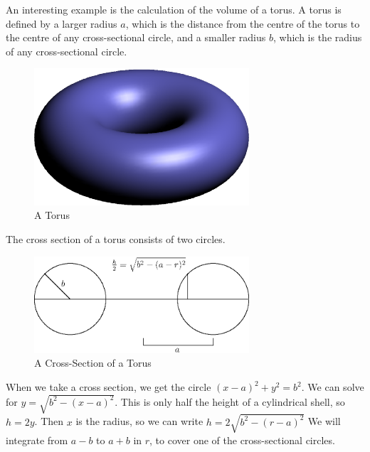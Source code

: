 \documentclass[fleqn]{report}
\begin{document}
\begin{example}
An interesting example is the calculation of the volume of a
torus. A torus is defined by a larger radius $a$, which is
the distance from the centre of the torus to the centre of any
cross-sectional circle, and a smaller radius $b$, which is the
radius of any cross-sectional circle.

\begin{figure}[ht]
\centering
\includegraphics[width=8cm]{figure23.eps}
\caption{A Torus}
\label{figure-torus}
\end{figure}

The cross section of a torus consists of two circles.

\begin{figure}[ht]
\centering
\includegraphics[width=8cm]{figure24.eps}
\caption{A Cross-Section of a Torus}
\label{figure-cross-section-torus}
\end{figure}

When we take a cross section, we get the circle $(x-a)^2 + y^2
= b^2$. We can solve for $y = \sqrt{b^2 - (x-a)^2}$. This is
only half the height of a cylindrical shell, so $h = 2y$. Then
$x$ is the radius, so we can write $h = 2 \sqrt{b^2 -
(r-a)^2}$ We will integrate from $a-b$ to $a+b$ in $r$, to
cover one of the cross-sectional circles.


\end{example}
\end{document}
